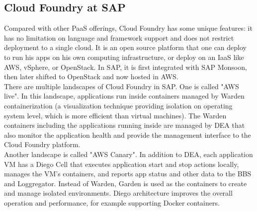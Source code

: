 \subsection{Cloud Foundry at SAP}
\label{cloud-foundry}
Compared with other PaaS offerings, Cloud Foundry has some unique features: it has no limitation on language and framework support and does not restrict deployment to a single cloud. It is an open source platform that one can deploy to run his apps on his own computing infrastructure, or deploy on an IaaS like \ac{AWS}, vSphere, or OpenStack. In SAP, it is first integrated with SAP Monsoon, then later shifted to OpenStack and now hosted in \ac{AWS}. \\
There are multiple landscapes of Cloud Foundry in SAP. One is called "AWS live". In this landscape, applications run inside containers managed by Warden   \citep{Warden} containerization (a visualization technique providing isolation on operating system level, which is more efficient than virtual machines). The Warden containers including the applications running inside are managed by \ac{DEA} that also monitor the application health and provide the management interface to the Cloud Foundry platform.\\
Another landscape is called "AWS Canary". In addition to \ac{DEA}, each application VM has a Diego Cell \citep{Diego} that executes application start and stop actions locally, manages the VM’s containers, and reports app status and other data to the \ac{BBS} \citep{BBS} and Loggregator. Instead of Warden, Garden \citep{Garden} is used as the containers to create and manage isolated environments. Diego architecture improves the overall operation and performance, for example supporting Docker containers.

